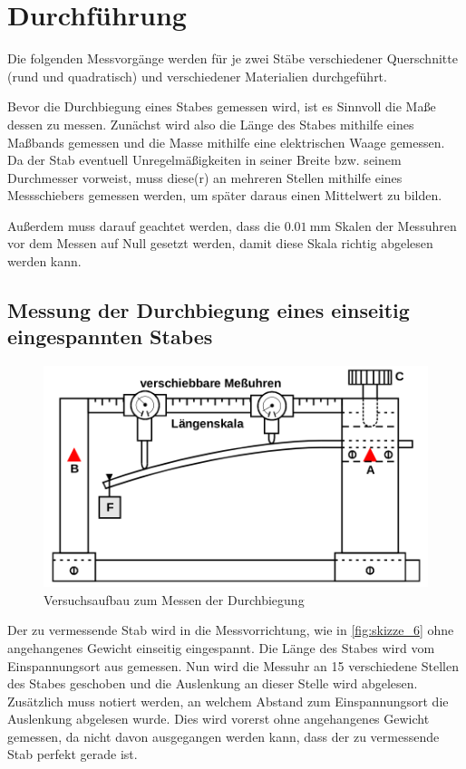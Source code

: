 \section{Durchführung}
\label{sec:Durchführung}

Die folgenden Messvorgänge werden für je zwei Stäbe verschiedener Querschnitte (rund und quadratisch) und verschiedener Materialien durchgeführt.

Bevor die Durchbiegung eines Stabes gemessen wird, ist es Sinnvoll die Maße dessen zu messen.
Zunächst wird also die Länge des Stabes mithilfe eines Maßbands gemessen und die Masse mithilfe eine elektrischen Waage gemessen.
Da der Stab eventuell Unregelmäßigkeiten in seiner Breite bzw. seinem Durchmesser vorweist, muss diese(r) an mehreren Stellen mithilfe eines Messschiebers gemessen werden, um später daraus einen Mittelwert zu bilden.

Außerdem muss darauf geachtet werden, dass die $\SI{0.01}{\milli\meter}$ Skalen der Messuhren vor dem Messen auf Null gesetzt werden, damit diese Skala richtig abgelesen werden kann.

\subsection{Messung der Durchbiegung eines einseitig eingespannten Stabes}
\label{sec:Durchführung_Einseitig}

\begin{figure}
    \centering
    \includegraphics[width=\textwidth]{images/skizze_6.png}
    \caption{Versuchsaufbau zum Messen der Durchbiegung}
    \label{fig:skizze_6}
\end{figure}

Der zu vermessende Stab wird in die Messvorrichtung, wie in \autoref{fig:skizze_6} ohne angehangenes Gewicht einseitig eingespannt.
Die Länge des Stabes wird vom Einspannungsort aus gemessen.
Nun wird die Messuhr an 15 verschiedene Stellen des Stabes geschoben und die Auslenkung an dieser Stelle wird abgelesen. Zusätzlich muss notiert werden, an welchem Abstand zum Einspannungsort die Auslenkung abgelesen wurde.
Dies wird vorerst ohne angehangenes Gewicht gemessen, da nicht davon ausgegangen werden kann, dass der zu vermessende Stab perfekt gerade ist.

